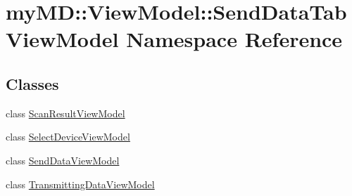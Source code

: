 \hypertarget{namespacemy_m_d_1_1_view_model_1_1_send_data_tab_view_model}{
\section{my\-MD::View\-Model::Send\-Data\-Tab\-View\-Model Namespace Reference}
\label{d4/dac/namespacemy_m_d_1_1_view_model_1_1_send_data_tab_view_model}
}


\subsection*{Classes}
\begin{CompactItemize}
\item 
class \hyperlink{classmy_m_d_1_1_view_model_1_1_send_data_tab_view_model_1_1_scan_result_view_model}{Scan\-Result\-View\-Model}
\item 
class \hyperlink{classmy_m_d_1_1_view_model_1_1_send_data_tab_view_model_1_1_select_device_view_model}{Select\-Device\-View\-Model}
\item 
class \hyperlink{classmy_m_d_1_1_view_model_1_1_send_data_tab_view_model_1_1_send_data_view_model}{Send\-Data\-View\-Model}
\item 
class \hyperlink{classmy_m_d_1_1_view_model_1_1_send_data_tab_view_model_1_1_transmitting_data_view_model}{Transmitting\-Data\-View\-Model}
\end{CompactItemize}
